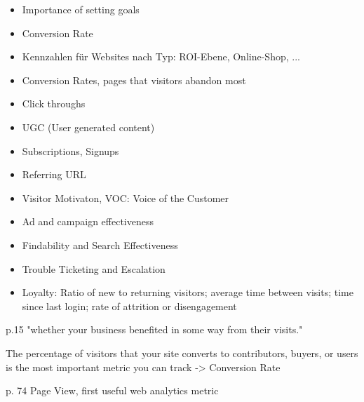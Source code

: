 \begin{itemize}
\item Importance of setting goals
\item Conversion Rate
\item Kennzahlen für Websites nach Typ: ROI-Ebene, Online-Shop, ...
\end{itemize}





\begin{itemize}
\item Conversion Rates, pages that visitors abandon most
\item Click throughs
\item UGC (User generated content)
\item Subscriptions, Signups
\item Referring URL
\item Visitor Motivaton, VOC: Voice of the Customer
\item Ad and campaign effectiveness
\item Findability and Search Effectiveness
\item Trouble Ticketing and Escalation
\item Loyalty: Ratio of new to returning visitors; average time between visits; time since last login; rate of attrition or disengagement
\end{itemize}

p.15 "whether your business benefited in some way from their visits."

The percentage of visitors that your site converts to contributors, buyers, or users is the most important metric you can track -> Conversion Rate

p. 74 Page View, first useful web analytics metric







